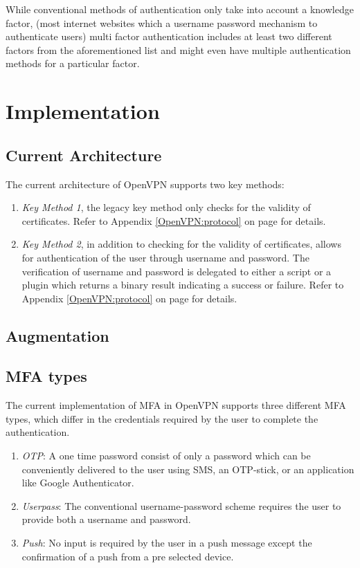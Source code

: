 \documentclass[11pt,oneside]{book}
\begin{document}
While conventional methods of authentication only take into account a knowledge factor,
(most internet websites which a username password mechanism to authenticate users)
multi factor authentication includes at least two different factors from the aforementioned
list and might even have multiple authentication methods for a particular factor.

\section{Implementation}
\subsection{Current Architecture}
The current architecture of OpenVPN supports two key methods:

\begin{enumerate}
    \item \emph{Key Method 1}, the legacy key method only checks for the validity of certificates.
        Refer to Appendix \ref{OpenVPN:protocol} on page \pageref{OpenVPN:protocol} for details.
    \item \emph{Key Method 2}, in addition to checking for the validity of certificates, allows for
        authentication of the user through username and password. The verification of username and
        password is delegated to either a script or a plugin which returns a binary result
        indicating a success or failure.
        Refer to Appendix \ref{OpenVPN:protocol} on page \pageref{OpenVPN:protocol} for details.
\end{enumerate}

\subsection{Augmentation}

\subsection{MFA types}
The current implementation of MFA in OpenVPN supports three different MFA types, which differ
in the credentials required by the user to complete the authentication.

\begin{enumerate}
    \item \emph{OTP}: A one time password consist of only a password which can be conveniently
        delivered to the user using SMS, an OTP-stick, or an application like Google Authenticator.
    \item \emph{Userpass}: The conventional username-password scheme requires the user to provide
        both a username and password.
    \item \emph{Push}: No input is required by the user in a push message except the confirmation
        of a push from a pre selected device.
\end{enumerate}
\end{document}
